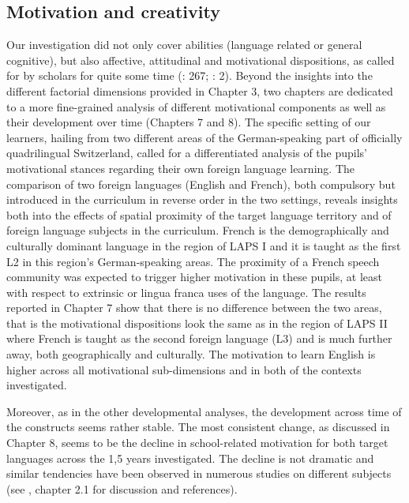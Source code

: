 \documentclass[output=paper]{langsci/langscibook}
\begin{document}
\subsection{Motivation and creativity}

Our investigation did not only cover abilities (language related or general cognitive), but also affective, attitudinal and motivational dispositions, as called for by scholars for quite some time (\citealt{Doernyei2010}: 267; \citealt{ParryStansfield1990}: 2). Beyond the insights into the different factorial dimensions provided in Chapter 3, two chapters are dedicated to a more fine-grained analysis of different motivational components as well as their development over time (Chapters 7 and 8). The specific setting of our learners, hailing from two different areas of the German-speaking part of officially quadrilingual Switzerland, called for a differentiated analysis of the pupils’ motivational stances regarding their own foreign language learning. The comparison of two foreign languages (English and French), both compulsory but introduced in the curriculum in reverse order in the two settings, reveals insights both into the effects of spatial proximity of the target language territory and of foreign language subjects in the curriculum. French is the demographically and culturally dominant language in the region of LAPS I and it is taught as the first L2 in this region’s German-speaking areas. The proximity of a French speech community was expected to trigger higher motivation in these pupils, at least with respect to extrinsic or lingua franca uses of the language. The results reported in Chapter 7 show that there is no difference between the two areas, that is the motivational dispositions look the same as in the region of LAPS II where French is taught as the second foreign language (L3) and is much further away, both geographically and culturally. The motivation to learn English is higher across all motivational sub-dimensions and in both of the contexts investigated.

Moreover, as in the other developmental analyses, the development across time of the constructs seems rather stable. The most consistent change, as discussed in Chapter 8, seems to be the decline in school-related motivation for both target languages across the 1,5 years investigated. The decline is not dramatic and similar tendencies have been observed in numerous studies on different subjects (see \citealt{Shan2020}, chapter 2.1 for discussion and references).
\end{document}
